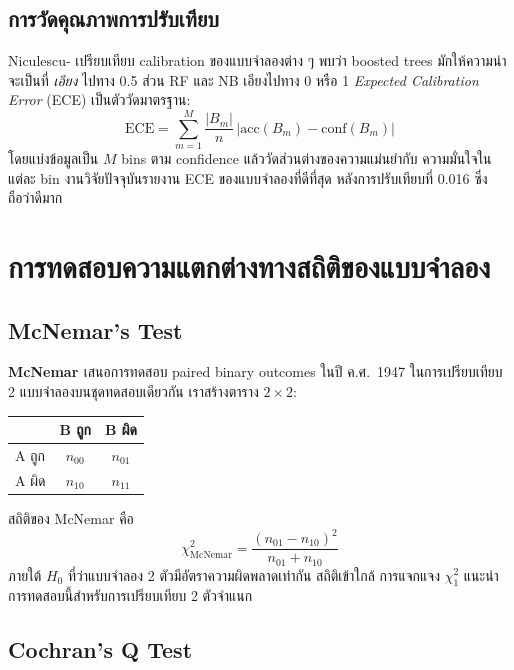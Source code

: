 \subsection{การวัดคุณภาพการปรับเทียบ}

Niculescu-\textcite{niculescu2005predicting} เปรียบเทียบ
calibration ของแบบจำลองต่าง ๆ พบว่า boosted trees มักให้ความน่าจะเป็นที่
\emph{เอียง} ไปทาง 0.5 ส่วน RF และ NB เอียงไปทาง 0 หรือ 1 \emph{Expected
Calibration Error} (ECE) \cite{naeini2015obtaining} เป็นตัววัดมาตรฐาน:
\begin{equation}
\mathrm{ECE} = \sum_{m=1}^{M} \frac{|B_m|}{n}\,\bigl|\mathrm{acc}(B_m) - \mathrm{conf}(B_m)\bigr|
\label{eq:ece}
\end{equation}
โดยแบ่งข้อมูลเป็น $M$ bins ตาม confidence แล้ววัดส่วนต่างของความแม่นยำกับ
ความมั่นใจในแต่ละ bin งานวิจัยปัจจุบันรายงาน ECE ของแบบจำลองที่ดีที่สุด
หลังการปรับเทียบที่ 0.016 ซึ่งถือว่าดีมาก

\section{การทดสอบความแตกต่างทางสถิติของแบบจำลอง}
\label{sec:lit-stats}

\subsection{McNemar's Test}

\textbf{McNemar \cite{mcnemar1947}} เสนอการทดสอบ paired binary outcomes
ในปี ค.ศ.\ 1947 ในการเปรียบเทียบ 2 แบบจำลองบนชุดทดสอบเดียวกัน เราสร้างตาราง
$2\times 2$:
\begin{center}
\begin{tabular}{l|cc}
 & B ถูก & B ผิด \\\hline
A ถูก & $n_{00}$ & $n_{01}$ \\
A ผิด & $n_{10}$ & $n_{11}$
\end{tabular}
\end{center}
สถิติของ McNemar คือ
\begin{equation}
\chi^2_{\mathrm{McNemar}} = \frac{(n_{01} - n_{10})^2}{n_{01} + n_{10}}
\label{eq:mcnemar}
\end{equation}
ภายใต้ $H_0$ ที่ว่าแบบจำลอง 2 ตัวมีอัตราความผิดพลาดเท่ากัน สถิติเข้าใกล้
การแจกแจง $\chi^2_1$ \textcite{dietterich1998approximate}
แนะนำการทดสอบนี้สำหรับการเปรียบเทียบ 2 ตัวจำแนก

\subsection{Cochran's Q Test}

